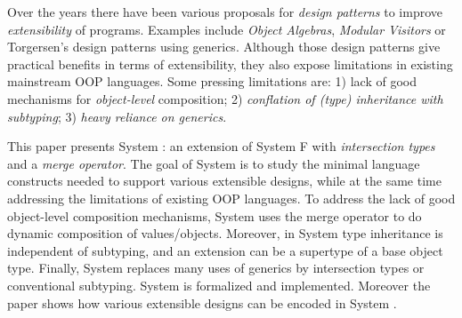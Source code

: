 Over the years there have been various proposals for \emph{design
  patterns} to improve \emph{extensibility} of programs.
Examples include \emph{Object Algebras}, \emph{Modular Visitors} or
Torgersen's design patterns using generics.
Although those design patterns give practical
benefits in terms of extensibility, they also expose limitations in
existing mainstream OOP languages. Some pressing
limitations are: 1) lack of good mechanisms for
\emph{object-level} composition; 2) \emph{conflation of
  (type) inheritance with subtyping}; 3) \emph{heavy reliance on generics}.

This paper presents System \name: an extension of System F with
\emph{intersection types} and a \emph{merge operator}.  The goal of System \name
is to study the minimal language constructs needed to support
various extensible designs, while at the same time addressing the
limitations of existing OOP languages. To address the lack of good
object-level composition mechanisms, System \name uses the merge
operator to do dynamic composition of values/objects. Moreover, in
System \name type inheritance is independent of subtyping, and an
extension can be a supertype of a base object type.  Finally, System
\name replaces many uses of generics by intersection types or
conventional subtyping. System \name is formalized and
implemented. Moreover the paper shows how various extensible designs
can be encoded in System \name.